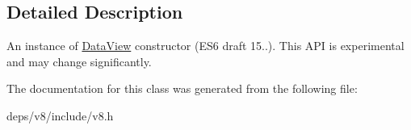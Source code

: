 \subsection{Detailed Description}
An instance of \hyperlink{classv8_1_1_data_view}{Data\+View} constructor (E\+S6 draft 15..). This A\+P\+I is experimental and may change significantly. 

The documentation for this class was generated from the following file\+:\begin{DoxyCompactItemize}
\item 
deps/v8/include/v8.\+h\end{DoxyCompactItemize}

